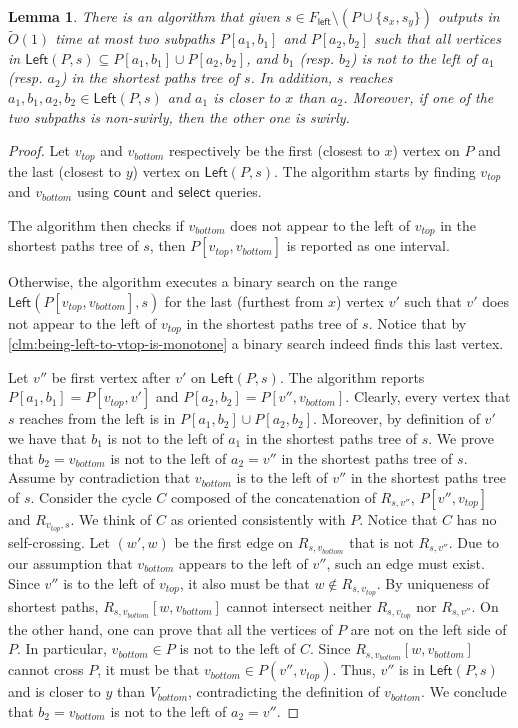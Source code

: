\documentclass{article}
\newcommand{\Left}{\mathsf{Left}}
\newcommand{\leftside}{\mathsf{left}}
\newcommand{\countA}{\mathsf{count}}
\newcommand{\select}{\mathsf{select}}
\newtheorem{lemma}{Lemma}
\newcommand{\Otild}{\tilde{O}}
\begin{document}
\begin{lemma}\label{lem:TopTreeBotTree-Partition}
There is an algorithm that given $s\in F_{\leftside} \setminus (P\cup\{s_x,s_y\})$ outputs in $\Otild(1)$ time at most two subpaths $P[a_1,b_1]$ and $P[a_2,b_2]$ such that all vertices in $\Left(P,s)\subseteq P[a_1,b_1] \cup P[a_2,b_2]$, and $b_1$ (resp. $b_2$) is not to the left of $a_1$ (resp. $a_2$) in the shortest paths tree of $s$.
In addition, $s$ reaches $a_1,b_1,a_2,b_2\in \Left(P,s)$ and $a_1$ is closer to $x$ than $a_2$.
Moreover, if one of the two subpaths is non-swirly, then the other one is swirly.
\end{lemma}
\begin{proof}
     Let $v_{top}$ and $v_{bottom}$ respectively be the first (closest to $x$) vertex on $P$ and the last (closest to $y$) vertex on $\Left(P,s)$.
     The algorithm starts by finding $v_{top}$ and $v_{bottom}$ using $\countA$ and $\select$ queries.

    The algorithm then checks if $v_{bottom}$ does not appear to the left of $v_{top}$ in the shortest paths tree of $s$, then $P[v_{top},v_{bottom}]$  is reported as one interval.

    Otherwise, the algorithm executes a binary search on the range $\Left(P[v_{top},v_{bottom}],s)$ for the last (furthest from $x$) vertex $v'$ such that $v'$ does not appear to the left of $v_{top}$ in the shortest paths tree of $s$.
    Notice that by \cref{clm:being-left-to-vtop-is-monotone} a binary search indeed finds this last vertex.

    Let $v''$ be first vertex after $v'$ on $\Left(P,s)$.
    The algorithm reports $P[a_1,b_1]=P[v_{top},v']$ and $P[a_2,b_2]=P[v'',v_{bottom}]$.
    Clearly, every vertex that $s$ reaches from the left is in $P[a_1,b_2]\cup P[a_2,b_2]$.
    Moreover, by definition of $v'$ we have that $b_1$ is not to the left of $a_1$ in the shortest paths tree of $s$.
    We prove that $b_2=v_{bottom}$ is not to the left of $a_2=v''$ in the shortest paths tree of $s$.
    Assume by contradiction that $v_{bottom}$ is to the left of $v''$ in the shortest paths tree of $s$.
    Consider the cycle $C$ composed of the concatenation of $R_{s,v''}$, $P[v'',v_{top}]$ and $R_{v_{top},s}$.
    We think of $C$ as oriented consistently with $P$.
    Notice that $C$ has no self-crossing.
    Let $(w',w)$ be the first edge on $R_{s,v_{bottom}}$ that is not $R_{s,v''}$.
    Due to our assumption that $v_{bottom}$ appears to the left of $v''$, such an edge must exist.
    Since $v''$ is to the left of $v_{top}$, it also must be that $w\notin R_{s,v_{top}}$.
    By uniqueness of shortest paths, $R_{s,v_{bottom}}[w,v_{bottom}]$ cannot intersect neither $R_{s,v_{top}}$ nor $R_{s,v''}$.
    On the other hand, one can prove that all the vertices of $P$ are not on the left side of $P$.
    In particular, $v_{bottom}\in P$ is not to the left of $C$.
    Since $R_{s,v_{bottom}}[w,v_{bottom}]$ cannot cross $P$, it must be that $v_{bottom}\in P(v'',v_{top})$.
    Thus, $v''$ is in $\Left(P,s)$ and is closer to $y$ than $V_{bottom}$, contradicting the definition of $v_{bottom}$.
    We conclude that $b_2=v_{bottom}$ is not to the left of $a_2=v''$.



\end{proof}
\end{document}

